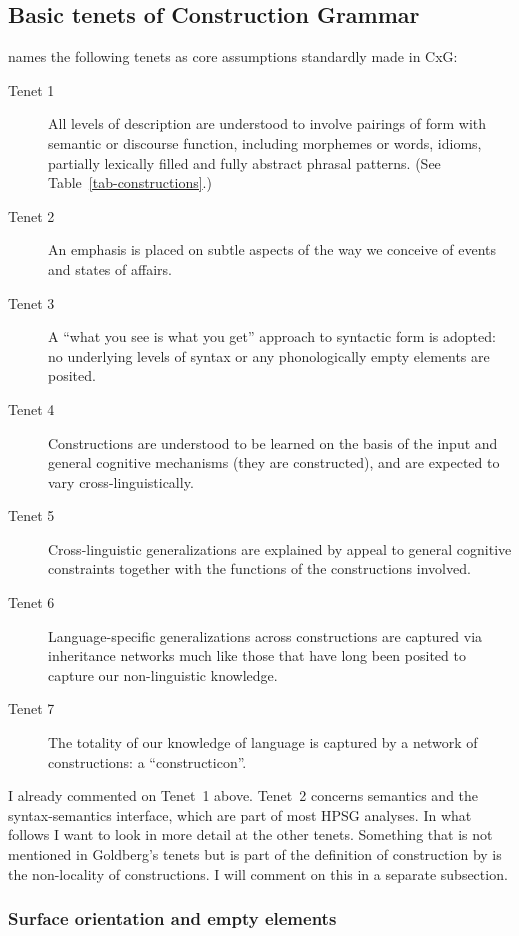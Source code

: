 \documentclass[output=paper,biblatex,babelshorthands,newtxmath,draftmode,colorlinks,citecolor=brown]{langscibook}
\begin{document}
\subsection{Basic tenets of Construction Grammar}
\label{sec-tenets}

\enlargethispage{7pt}
\citet[]{Goldberg2003b} names the following tenets as core assumptions standardly made in CxG:
\begin{description}
\item[Tenet 1] All levels of description are understood to involve pairings of form with semantic or discourse function, including morphemes or words, idioms, partially lexically filled and fully abstract phrasal patterns. (See Table~\ref{tab-constructions}.)
\item[Tenet 2] An emphasis is placed on subtle aspects of the way we conceive of events and states of
affairs.
\item[Tenet 3] A ``what you see is what you get'' approach to syntactic form is adopted: no underlying levels
  of syntax or any phonologically empty elements are posited.
\item[Tenet 4] Constructions are understood to be learned on the basis of the input and general cognitive mechanisms (they are constructed), and are expected to vary cross-linguistically.
\item[Tenet 5] Cross-linguistic generalizations are explained by appeal to general cognitive constraints together with the functions of the constructions involved.
\item[Tenet 6] Language-specific generalizations across constructions are captured via inheritance networks much like those that have long been posited to capture our non-linguistic knowledge.
\item[Tenet 7] The totality of our knowledge of language is captured by a network of constructions: a ``constructicon''.
\end{description}

I already commented on Tenet~1 above. Tenet~2 concerns semantics and the syntax-semantics interface,
which are part of most HPSG analyses. In what follows I want to look in more detail at the other
tenets. Something that is not mentioned in Goldberg's tenets but is part of the definition of
construction by \citet[]{FKoC88a} is the non-locality of constructions. I will comment on
this in a separate subsection.

\subsubsection{Surface orientation and empty elements}
\end{document}
